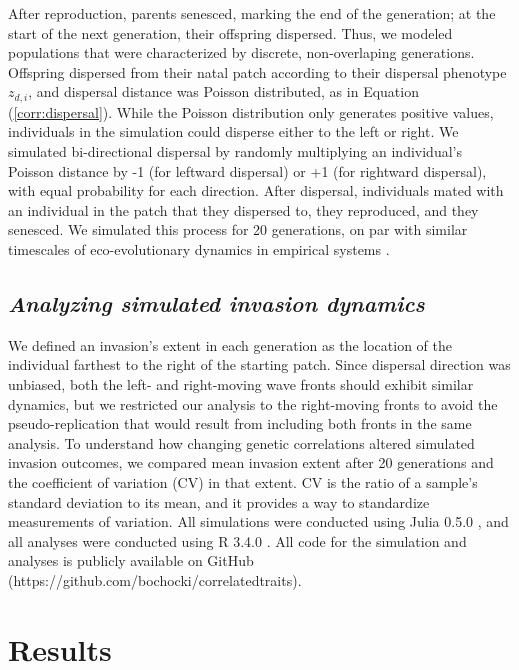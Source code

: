 After reproduction, parents senesced, marking the end of the generation; at the start of the next generation, their offspring dispersed. Thus, we modeled populations that were characterized by discrete, non-overlaping generations. Offspring dispersed from their natal patch according to their dispersal phenotype $z_{d,i}$, and dispersal distance was Poisson distributed, as in Equation (\ref{corr:dispersal}). While the Poisson distribution only generates positive values, individuals in the simulation could disperse either to the left or right. We simulated bi-directional dispersal by randomly multiplying an individual's Poisson distance by -1 (for leftward dispersal) or +1 (for rightward dispersal), with equal probability for each direction. After dispersal, individuals mated with an individual in the patch that they dispersed to, they reproduced, and they senesced. We simulated this process for 20 generations, on par with similar timescales of eco-evolutionary dynamics in empirical systems \citep{williams_rapid_2016,ochocki_rapid_2017,weiss-lehman_rapid_2017}.

\subsection{\textit{Analyzing simulated invasion dynamics}}

We defined an invasion's extent in each generation as the location of the individual farthest to the right of the starting patch. Since dispersal direction was unbiased, both the left- and right-moving wave fronts should exhibit similar dynamics, but we restricted our analysis to the right-moving fronts to avoid the pseudo-replication that would result from including both fronts in the same analysis. To understand how changing genetic correlations altered simulated invasion outcomes, we compared mean invasion extent after 20 generations and the coefficient of variation (CV) in that extent. CV is the ratio of a sample's standard deviation to its mean, and it provides a way to standardize measurements of variation. All simulations were conducted using Julia 0.5.0 \citep{bezanson_julia:_2017}, and all analyses were conducted using R 3.4.0 \citep{r_core_team_r:_2015}. All code for the simulation and analyses is publicly available on GitHub (https://github.com/bochocki/correlatedtraits).

\section{Results}

